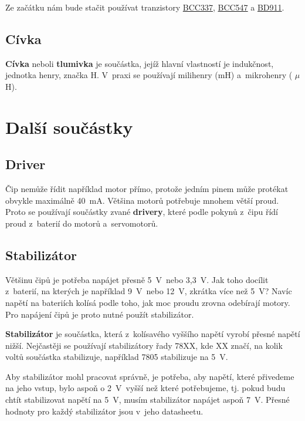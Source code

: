 Ze začátku nám bude stačit používat tranzistory 
\hyperlink{BCC337}{BCC337}, 
\hyperlink{BCC547}{BCC547} a
\hyperlink{BD911}{BD911}. 


\subsection{Cívka}

{\bf Cívka} neboli {\bf tlumivka} je součástka, 
jejíž hlavní vlastností je indukčnost, jednotka henry, značka H.
 V~praxi se používají milihenry (mH) a~mikrohenry ( $\mu$H).

\section{Další součástky}

\subsection{Driver} \label{driver}

Čip nemůže řídit například motor přímo, protože jedním pinem může protékat obvykle maximálně 40~mA. 
Většina motorů potřebuje mnohem větší proud.
 Proto se používají součástky zvané {\bf drivery}, které podle pokynů z~čipu řídí proud z~baterií do motorů a~servomotorů. 

\subsection{Stabilizátor}

Většinu čipů je potřeba napájet přesně 5~V~nebo 3,3~V. Jak toho docílit z~baterií, na kterých je například 9~V~nebo 12~V, zkrátka více než 5~V? 
Navíc napětí na bateriích kolísá podle toho, jak moc proudu zrovna odebírají motory. 
Pro napájení čipů je proto nutné použít stabilizátor. 

{\bf Stabilizátor} je součástka, která z~kolísavého vyššího napětí vyrobí přesné napětí nižší. %
Nejčastěji se používají stabilizátory řady 78XX, kde XX značí, na kolik voltů součástka stabilizuje, například 7805 stabilizuje na 5~V. 

Aby stabilizátor mohl pracovat správně, je potřeba, aby napětí, které přivedeme na jeho vstup,
 bylo aspoň o 2~V~vyšší než které potřebujeme, tj. pokud budu chtít stabilizovat napětí na 5~V, 
 musím stabilizátor napájet aspoň 7~V. Přesné hodnoty pro každý stabilizátor jsou v~jeho datasheetu. 


